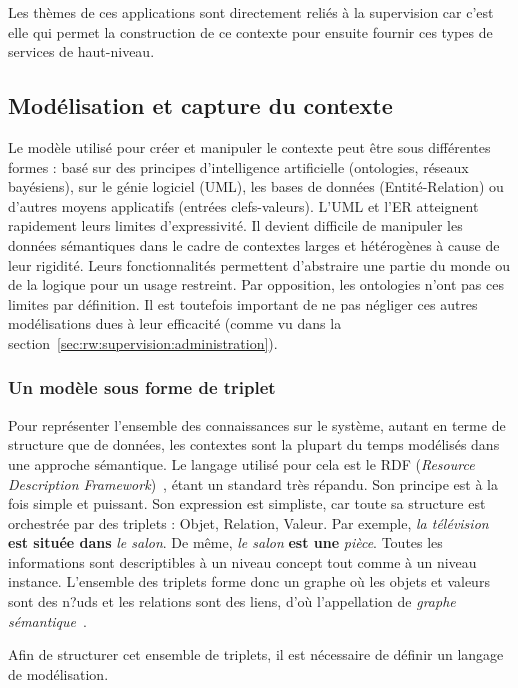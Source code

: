 Les thèmes de ces applications sont directement reliés à la supervision car c'est elle qui permet la construction de ce contexte pour ensuite fournir ces types de services de haut-niveau.

\subsection{Modélisation et capture du contexte}
Le modèle utilisé pour créer et manipuler le contexte peut être sous différentes formes : basé sur des principes d'intelligence artificielle (ontologies, réseaux bayésiens), sur le génie logiciel (UML), les bases de données (Entité-Relation) ou d'autres moyens applicatifs (entrées clefs-valeurs). L'UML et l'ER atteignent rapidement leurs limites d'expressivité. Il devient difficile de manipuler les données sémantiques dans le cadre de contextes larges et hétérogènes à cause de leur rigidité. Leurs fonctionnalités permettent d'abstraire une partie du monde ou de la logique pour un usage restreint. Par opposition, les ontologies n'ont pas ces limites par définition. Il est toutefois important de ne pas négliger ces autres modélisations dues à leur efficacité (comme vu dans la section~\ref{sec:rw:supervision:administration}).

\subsubsection{Un modèle sous forme de triplet}
Pour représenter l'ensemble des connaissances sur le système, autant en terme de structure que de données, les contextes sont la plupart du temps modélisés dans une approche sémantique. Le langage utilisé pour cela est le RDF (\textit{Resource Description Framework})~\cite{W3C:RDF}, étant un standard très répandu. Son principe est à la fois simple et puissant. Son expression est simpliste, car toute sa structure est orchestrée par des triplets : Objet, Relation, Valeur. Par exemple, \textit{la télévision} \textbf{est située dans} \textit{le salon}. De même, \textit{le salon} \textbf{est une} \textit{pièce}. Toutes les informations sont descriptibles à un niveau concept tout comme à un niveau instance. L'ensemble des triplets forme donc un graphe où les objets et valeurs sont des n?uds et les relations sont des liens, d'où l'appellation de \textit{graphe sémantique}~\cite{Minsky:knowledge}.

Afin de structurer cet ensemble de triplets, il est nécessaire de définir un langage de modélisation.

